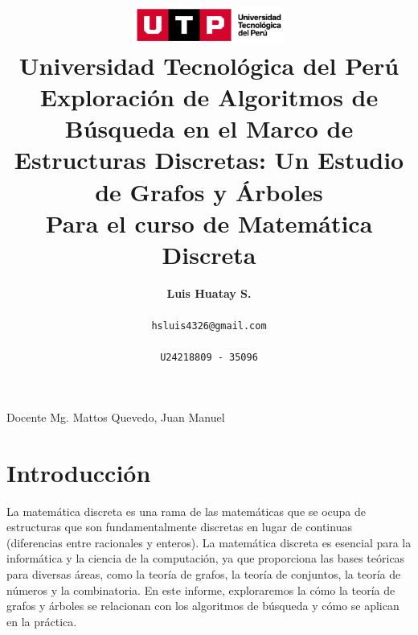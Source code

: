 \documentclass[11pt, a4paper]{article}
\title{
  \includegraphics[width=5cm]{./assets/logo-utp.png} \\
  \vspace{1cm}
  \textbf{Universidad Tecnológica del Perú} \\
  \vspace{3.5cm}
  \textbf{Exploración de Algoritmos de Búsqueda en el Marco de Estructuras Discretas: Un Estudio de Grafos y Árboles} \\ 
  \vspace{1cm}
  \large \textbf{Para el curso de Matemática Discreta}
}
\author{\textbf{Luis Huatay S.}\\\\\texttt{hsluis4326@gmail.com}\\\\\texttt{U24218809 - 35096}}
\begin{document}
\maketitle
\begin{center}
Docente Mg. Mattos Quevedo, Juan Manuel
\end{center}
\restoregeometry

\newpage 

\tableofcontents


\newpage
\vspace*{\fill}
\section{Introducción}

La matemática discreta es una rama de las matemáticas que se ocupa de estructuras que son fundamentalmente discretas en lugar de continuas (diferencias entre racionales y enteros). La matemática discreta es esencial para la informática y la ciencia de la computación, ya que proporciona las bases teóricas para diversas áreas, como la teoría de grafos, la teoría de conjuntos, la teoría de números y la combinatoria. En este informe, exploraremos la cómo la teoría de grafos y árboles se relacionan con los algoritmos de búsqueda y cómo se aplican en la práctica.
\end{document}
